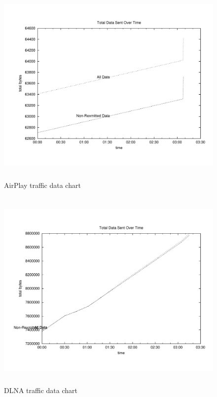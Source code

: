 \begin{figure}[htb]
\centering \includegraphics[height=10cm]{charts/AirPlay_traffic_data}
\caption{AirPlay traffic data chart \label{chart6}}
\end{figure}
\begin{figure}[htb]
\centering \includegraphics[height=10cm]{charts/dlna_traffic_data}
\caption{DLNA traffic data chart \label{chart6}}
\end{figure}


